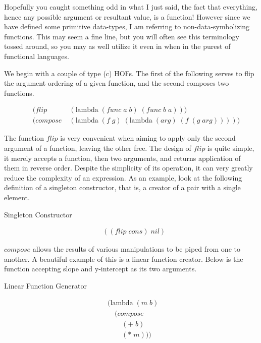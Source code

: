 Hopefully you caught something odd in what I just said, the fact that everything, 
hence any possible argument or resultant value, is a function! However since we 
have defined some primitive data-types, I am referring to non-data-symbolizing 
functions. This may seem a fine line, but you will often see this terminology 
tossed around, so you may as well utilize it even in when in the purest of 
functional languages.

We begin with a couple of type (c) HOFs. The first of the following serves to flip 
the argument ordering of a given function, and the second composes two functions.
\begin{figure}[ht]
\caption{}\label{scheme}
\begin{align*}
& (flip \; &(\text{lambda} \; (func \; a \; b) \; (func \; b \; a)))
\\& (compose \; &(\text{lambda} \; (f \; g) \; (\text{lambda} \; (arg) \; (f \; (g \; arg)))))
\end{align*}
\end{figure}

The function $flip$ is very convenient when aiming to apply only the second 
argument of a function, leaving the other free. The design of $flip$ is quite 
simple, it merely accepts a function, then two arguments, and returns application 
of them in reverse order. Despite the simplicity of its operation, it can very 
greatly reduce the complexity of an expression. As an example, look at the 
following definition of a singleton constructor, that is, a creator of a pair with 
a single element.

Singleton Constructor
\begin{figure}[ht]
\caption{}\label{scheme}
\begin{align*}
& ((flip \; cons) \; nil)
\end{align*}
\end{figure}


$compose$ allows the results of various manipulations to be piped from one to 
another. A beautiful example of this is a linear function creator. Below is the 
function accepting slope and y-intercept as its two arguments.

Linear Function Generator
\begin{figure}[ht]
\caption{}\label{scheme}
\begin{align*}
& (\text{lambda} \; (m \; b) \; 
\\& \quad (compose \; 
\\& \qquad (+ \; b) \; 
\\& \qquad (* \; m)))
\end{align*}
\end{figure}

